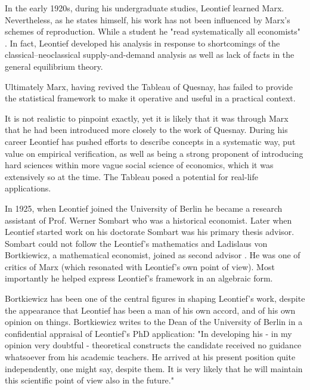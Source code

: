 \documentclass[12pt,a4paper]{scrartcl}
\begin{document}
	In the early 1920s, during his undergraduate studies, Leontief learned Marx. Nevertheless, as he states himself, his work has not been influenced by Marx's schemes of reproduction. While a student he "read systematically all economists" \cite[p. 53]{Hamilton2008}. In fact, Leontief developed his analysis in response to shortcomings of the classical–neoclassical supply-and-demand analysis as well as lack of facts in the general equilibrium theory.
	
	Ultimately Marx, having revived the Tableau of Quesnay, has failed to provide the statistical framework to make it operative and useful in a practical context. \cite[p.729]{Miller2009} \cite[p.232]{Schumpeter1954}
	
	It is not realistic to pinpoint exactly, yet it is likely that it was through Marx that he had been introduced more closely to the work of Quesnay. During his career Leontief has pushed efforts to describe concepts in a systematic way, put value on empirical verification, as well as being a strong proponent of introducing hard sciences within more vague social science of economics, which it was extensively so at the time. The Tableau posed a potential for real-life applications. \cite[p.16, p.20]{Hamilton2008}
	
	In 1925, when Leontief joined the University of Berlin he became a research assistant of Prof. Werner Sombart who was a historical economist. Later when Leontief started work on his doctorate Sombart was his primary thesis advisor. Sombart could not follow the Leontief's mathematics and Ladislaus von Bortkiewicz, a mathematical economist, joined as second advisor \cite[p.513]{Baumol2009}. He was one of critics of Marx (which resonated with Leontief's own point of view). Most importantly he helped express Leontief's framework in an algebraic form.
	
	Bortkiewicz has been one of the central figures in shaping Leontief's work, despite the appearance that Leontief has been a man of his own accord, and of his own opinion on things. Bortkiewicz writes to the Dean of the University of Berlin in a confidential appraisal of Leontief's PhD application: "In developing his - in my opinion very doubtful - theoretical constructs the candidate received no guidance whatsoever from his academic teachers. He arrived at his present position quite independently, one might say, despite them. It is very likely that he will maintain this scientific point of view also in the future." \cite[p.179]{Samuelson1991}
	
\end{document}
